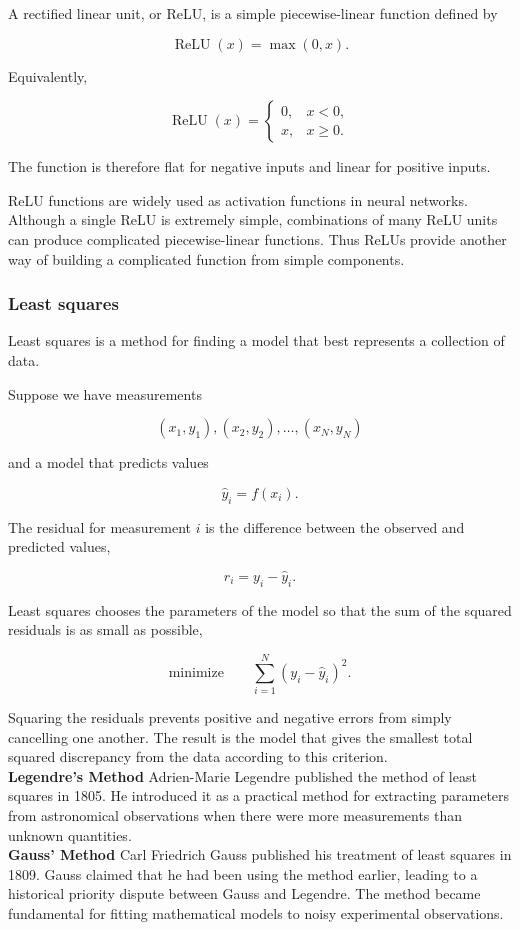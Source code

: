 A rectified linear unit, or ReLU, is a simple piecewise-linear function defined by

\[
    \boxed{\operatorname{ReLU}(x)=\max(0,x).}
\]

Equivalently,

\[
    \operatorname{ReLU}(x) =
    \begin{cases}
        0, & x<0, \\
        x, & x\geq0.
    \end{cases}
\]

The function is therefore flat for negative inputs and linear for positive inputs.

ReLU functions are widely used as activation functions in neural networks.
Although a single ReLU is extremely simple, combinations of many ReLU units can produce complicated piecewise-linear functions.
Thus ReLUs provide another way of building a complicated function from simple components.


\subsubsection{Least squares}

Least squares is a method for finding a model that best represents a collection of data.

Suppose we have measurements

\[
    (x_1,y_1), (x_2,y_2), \ldots, (x_N,y_N)
\]

and a model that predicts values

\[
    \hat{y}_i=f(x_i).
\]

The residual for measurement $i$ is the difference between the observed and predicted values,

\[
    r_i = y_i-\hat{y}_i.
\]

Least squares chooses the parameters of the model so that the sum of the squared residuals is as small as possible,

\[
    \boxed{\text{minimize} \qquad \sum_{i=1}^{N}\left(y_i-\hat{y}_i\right)^2.}
\]

Squaring the residuals prevents positive and negative errors from simply cancelling one another.
The result is the model that gives the smallest total squared discrepancy from the data according to this criterion.
% 
% 
\medskip
\\
\textbf{Legendre's Method}
Adrien-Marie Legendre published the method of least squares in 1805.
He introduced it as a practical method for extracting parameters from astronomical observations when there were more measurements than unknown quantities.
% 
% 
\medskip
\\
\textbf{Gauss' Method}
Carl Friedrich Gauss published his treatment of least squares in 1809.
Gauss claimed that he had been using the method earlier, leading to a historical priority dispute between Gauss and Legendre.
The method became fundamental for fitting mathematical models to noisy experimental observations.


